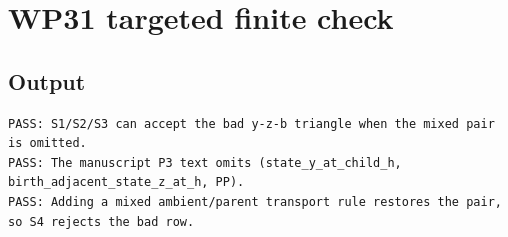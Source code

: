 \documentclass[11pt]{article}
\begin{document}
\appendix

\section{WP31 targeted finite check}\label{app:wp31}

\subsection{Output}
\begin{lstlisting}[style=reviewtext]
PASS: S1/S2/S3 can accept the bad y-z-b triangle when the mixed pair is omitted.
PASS: The manuscript P3 text omits (state_y_at_child_h, birth_adjacent_state_z_at_h, PP).
PASS: Adding a mixed ambient/parent transport rule restores the pair, so S4 rejects the bad row.
\end{lstlisting}
\end{document}

